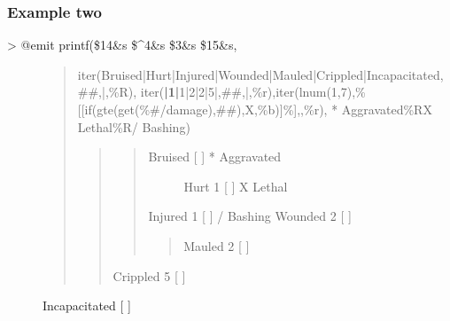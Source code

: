 \documentclass[letterpaper,10pt,english]{sphinxmanual}
\begin{document}
\subsubsection{Example two}
\label{\detokenize{advanced:example-two}}\begin{description}
\item[{\textgreater{} @emit printf(\$14\&s \$\textasciicircum{}4\&s \$\sphinxhyphen{}3\&s \$15\&s,}] \leavevmode\begin{quote}

\sphinxAtStartPar
iter(Bruised|Hurt|Injured|Wounded|Mauled|Crippled|Incapacitated,\#\#,|,\%R),
iter({\color{red}\bfseries{}|\sphinxhyphen{}1|}\sphinxhyphen{}1|\sphinxhyphen{}2|\sphinxhyphen{}2|\sphinxhyphen{}5|,\#\#,|,\%r),iter(lnum(1,7),\%{[}{[}if(gte(get(\%\#/damage),\#\#),X,\%b){]}\%{]},,\%r),
* Aggravated\%RX Lethal\%R/ Bashing)
\begin{quote}
\begin{quote}
\begin{description}
\item[{Bruised      {[} {]}    * Aggravated}] \leavevmode
\sphinxAtStartPar
Hurt  \sphinxhyphen{}1  {[} {]}        X Lethal

\end{description}

\sphinxAtStartPar
Injured  \sphinxhyphen{}1  {[} {]}       / Bashing
Wounded  \sphinxhyphen{}2  {[} {]}
\begin{quote}

\sphinxAtStartPar
Mauled  \sphinxhyphen{}2  {[} {]}
\end{quote}
\end{quote}

\sphinxAtStartPar
Crippled  \sphinxhyphen{}5  {[} {]}
\end{quote}
\end{quote}

\sphinxAtStartPar
Incapacitated      {[} {]}

\end{description}
\end{document}
